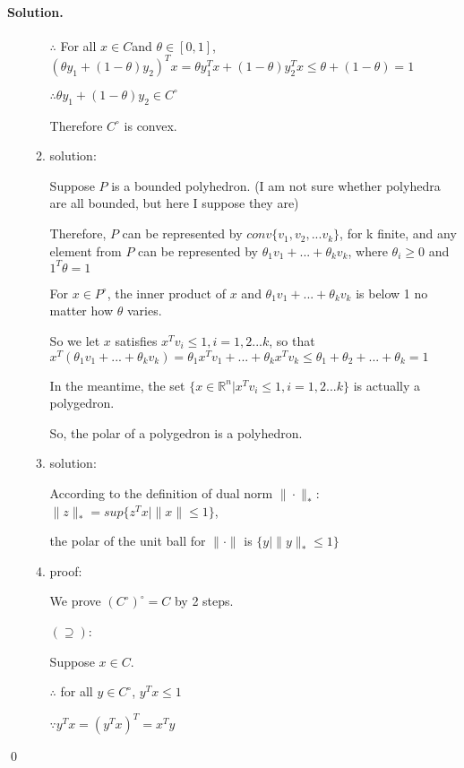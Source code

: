 \documentclass[a4paper]{article}
\newenvironment{solution}
{\color{blue} \paragraph{Solution.}}
{\newline \qed}
\begin{document}
\begin{solution}
\begin{enumerate}[a)]
\begin{enumerate}[1)]
                $\therefore $ For all $x \in C$and $\theta \in[0, 1]$, $(\theta y_1+(1-\theta)y_2)^Tx=\theta y_1^Tx+(1-\theta)y_2^Tx\leq \theta+(1-\theta)=1$

                $\therefore \theta y_1+(1-\theta)y_2\in C^\circ$

                Therefore $C^\circ$ is convex.

                \item solution:
                
                Suppose $P$ is a bounded polyhedron. (I am not sure whether polyhedra are all bounded, but here I suppose they are)
                
                Therefore, $P$ can be represented by $conv\{v_1, v_2, ...v_k\}$, for k finite, and any element from $P$ can be represented by $\theta_1v_1+...+\theta_kv_k$, where $\theta_i\geq 0$ and $1^T\theta=1$
                
                For $x\in P^\circ$, the inner product of $x$ and $\theta_1v_1+...+\theta_kv_k$ is below 1 no matter how $\theta$ varies.

                So we let $x$ satisfies $x^Tv_i\leq 1, i=1,2...k$, so that $x^T(\theta_1v_1+...+\theta_kv_k)=\theta_1x^Tv_1+...+\theta_kx^Tv_k\leq \theta_1+\theta_2+...+\theta_k=1$

                In the meantime, the set $\{x\in \mathbb{R}^n|x^Tv_i\leq 1, i=1,2...k\}$ is actually a polygedron.

                So, the polar of a polygedron is a polyhedron.

                \item solution:
                
                According to the definition of dual norm $\|\cdot\|_*$: $\|z\|_* = sup\{z^Tx|\|x\|\leq 1\}$,

                the polar of the unit ball for $\|\cdot\|$ is $\{y|\|y\|_*\leq 1\}$

                \item proof:
                
                We prove $(C^\circ)^\circ=C$ by 2 steps.

                $(\supseteq)$: 

                Suppose $x\in C$.

                $\therefore $ for all $y\in C^\circ$, $y^Tx\leq 1$

                $\because y^Tx=(y^Tx)^T=x^Ty$


\end{enumerate}
\end{enumerate}
\end{solution}
\end{document}
